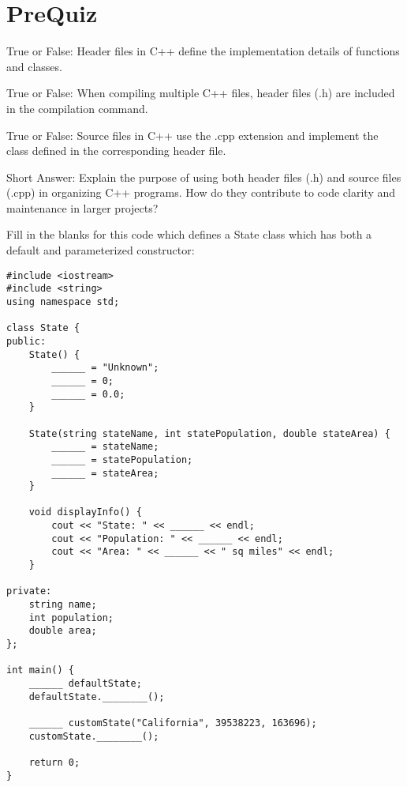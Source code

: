 \section{PreQuiz}
\begin{problem}
True or False: Header files in C++ define the implementation details of functions and classes.
\end{problem}

\begin{problem}
True or False: When compiling multiple C++ files, header files (.h) are included in the compilation command.
\end{problem}

\begin{problem}
True or False: Source files in C++ use the .cpp extension and implement the class defined in the corresponding header file.
\end{problem}

\begin{problem}
Short Answer: Explain the purpose of using both header files (.h) and source files (.cpp) in organizing C++ programs. How do they contribute to code clarity and maintenance in larger projects?
\end{problem}

\begin{problem}
Fill in the blanks for this code which defines a State class which has both a default and parameterized constructor:

\begin{verbatim}
#include <iostream>
#include <string>
using namespace std;

class State {
public:
    State() {
        ______ = "Unknown";
        ______ = 0;
        ______ = 0.0;
    }

    State(string stateName, int statePopulation, double stateArea) {
        ______ = stateName;
        ______ = statePopulation;
        ______ = stateArea;
    }

    void displayInfo() {
        cout << "State: " << ______ << endl;
        cout << "Population: " << ______ << endl;
        cout << "Area: " << ______ << " sq miles" << endl;
    }

private:
    string name;
    int population;
    double area;
};

int main() {
    ______ defaultState;
    defaultState.________();

    ______ customState("California", 39538223, 163696);
    customState.________();

    return 0;
}
\end{verbatim}
\end{problem}

